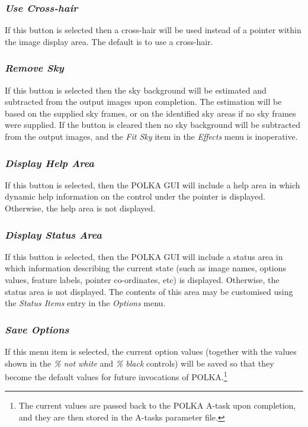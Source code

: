 \documentclass[11pt]{article}
\newcommand{\htmlref}[2]{#1}
\newcommand{\xlabel}[1]{}
\newcommand{\mylabel}[1] {\xlabel{#1}\label{#1}}
\begin{document}
\subsubsection {\mylabel{POLKA_USE_CROSS_HAIR}\emph{Use Cross-hair}}
If this button is selected then a cross-hair will be used instead of a
pointer within the \htmlref{image display area}{POLKA_IMAGE_DISPLAY}.
The default is to use a cross-hair.

\subsubsection {\mylabel{POLKA_REMOVE_SKY}\emph{Remove Sky}}
If this button is selected then the sky background will be estimated and
subtracted from the output images upon completion. The estimation will be
based on the supplied sky frames, or on the identified sky areas if no
sky frames were supplied. If the button is cleared then no sky background
will be subtracted from the output images, and the
\htmlref{\emph{Fit Sky}}{POLKA_FITSKY_EFFECT} item in the
\htmlref{\emph{Effects}}{POLKA_EFFECTS_MENU} menu is inoperative.

\subsubsection {\mylabel{POLKA_DISPLAY_HELP_AREA}\emph{Display Help Area}}
If this button is selected, then the POLKA GUI will include a
\htmlref{help area}{POLKA_HELP_AREA} in which dynamic help information
on the control under the pointer is displayed. Otherwise, the help area
is not displayed.

\subsubsection {\mylabel{POLKA_DISPLAY_STATUS_AREA}\emph{Display Status Area}}
If this button is selected, then the POLKA GUI will include a
\htmlref{status area}{POLKA_HELP_AREA} in which information
describing the current state (such as image names, options values,
feature labels, pointer co-ordinates, etc) is displayed. Otherwise, the
status area is not displayed. The contents of this area may be customised
using the \htmlref{\emph{Status Items}}{POLKA_STATUS_ITEMS} entry in the
\htmlref{\emph{Options}}{POLKA_OPTIONS_MENU} menu.

\subsubsection {\mylabel{POLKA_SAVE_OPTIONS}\emph{Save Options}}
If this menu item is selected, the current option values (together with
the values shown in the \htmlref{\emph{\% not white}}{POLKA_NOT_WHITE}
and \htmlref{\emph{\% black}}{POLKA_BLACK} controls) will be saved so that
they become the default values for future invocations of
POLKA.\footnote{The current values are passed back to the POLKA A-task
upon completion, and they are then stored in the A-tasks parameter file.}
\end{document}
